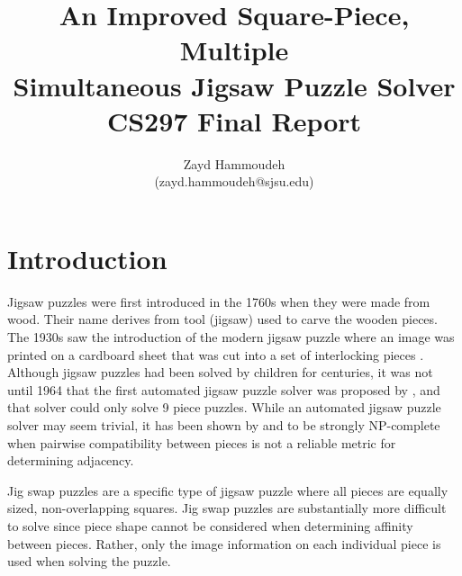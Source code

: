 \documentclass{report}
\title{   An Improved Square-Piece, Multiple
       \\ Simultaneous Jigsaw Puzzle Solver
       \\[1in]
	   CS297 Final Report}
\author{
  Zayd Hammoudeh \\
  (zayd.hammoudeh@sjsu.edu)
  }
\begin{document}
\maketitle


\renewcommand{\contentsname}{Table of Contents} %
\tableofcontents{\protect\newpage}

\listoffigures
\newpage

\listoftables
\newpage
 

\renewcommand\thesection{\arabic{section}}






\section{Introduction}\label{sec:introduction}

Jigsaw puzzles were first introduced in the 1760s when they were made from wood.  Their name derives from tool (jigsaw) used to carve the wooden pieces.   The 1930s saw the introduction of the modern jigsaw puzzle where an image was printed on a cardboard sheet that was cut into a set of interlocking pieces \cite{williams1990, williams2004}.  Although jigsaw puzzles had been solved by children for centuries, it was not until 1964 that the first automated jigsaw puzzle solver was proposed by \cite{freeman1964}, and that solver could only solve 9 piece puzzles.  While an automated jigsaw puzzle solver may seem trivial, it has been shown by \cite{altman1990} and \cite{demaine2007} to be strongly NP-complete when pairwise compatibility between pieces is not a reliable metric for determining adjacency.

Jig swap puzzles are a specific type of jigsaw puzzle where all pieces are equally sized, non-overlapping squares.  Jig swap puzzles are substantially more difficult to solve since piece shape cannot be considered when determining affinity between pieces.  Rather, only the image information on each individual piece is used when solving the puzzle.  
\end{document}
